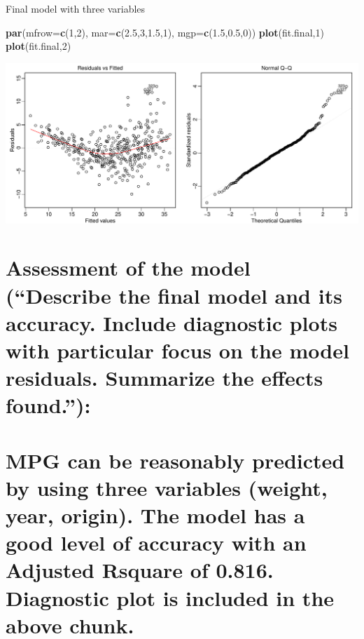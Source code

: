 \documentclass[]{article}
\newenvironment{Shaded}{\begin{snugshade}}{\end{snugshade}}
\newcommand{\KeywordTok}[1]{\textcolor[rgb]{0.13,0.29,0.53}{\textbf{#1}}}
\newcommand{\DataTypeTok}[1]{\textcolor[rgb]{0.13,0.29,0.53}{#1}}
\newcommand{\DecValTok}[1]{\textcolor[rgb]{0.00,0.00,0.81}{#1}}
\newcommand{\FloatTok}[1]{\textcolor[rgb]{0.00,0.00,0.81}{#1}}
\newcommand{\NormalTok}[1]{#1}
\begin{document}
Final model with three variables

\begin{Shaded}
\begin{Highlighting}[]
\KeywordTok{par}\NormalTok{(}\DataTypeTok{mfrow=}\KeywordTok{c}\NormalTok{(}\DecValTok{1}\NormalTok{,}\DecValTok{2}\NormalTok{), }\DataTypeTok{mar=}\KeywordTok{c}\NormalTok{(}\FloatTok{2.5}\NormalTok{,}\DecValTok{3}\NormalTok{,}\FloatTok{1.5}\NormalTok{,}\DecValTok{1}\NormalTok{), }\DataTypeTok{mgp=}\KeywordTok{c}\NormalTok{(}\FloatTok{1.5}\NormalTok{,}\FloatTok{0.5}\NormalTok{,}\DecValTok{0}\NormalTok{))}
\KeywordTok{plot}\NormalTok{(fit.final,}\DecValTok{1}\NormalTok{)}
\KeywordTok{plot}\NormalTok{(fit.final,}\DecValTok{2}\NormalTok{)}
\end{Highlighting}
\end{Shaded}

\includegraphics{hw2_fall18_files/figure-latex/unnamed-chunk-17-1.pdf}

\section{\texorpdfstring{Assessment of the model (``Describe the final
model and its accuracy. Include diagnostic plots with particular focus
on the model residuals. Summarize the effects
found.''):}{Assessment of the model (Describe the final model and its accuracy. Include diagnostic plots with particular focus on the model residuals. Summarize the effects found.):}}\label{assessment-of-the-model-describe-the-final-model-and-its-accuracy.-include-diagnostic-plots-with-particular-focus-on-the-model-residuals.-summarize-the-effects-found.}

\section{MPG can be reasonably predicted by using three variables
(weight, year, origin). The model has a good level of accuracy with an
Adjusted Rsquare of 0.816. Diagnostic plot is included in the above
chunk.}\label{mpg-can-be-reasonably-predicted-by-using-three-variables-weight-year-origin.-the-model-has-a-good-level-of-accuracy-with-an-adjusted-rsquare-of-0.816.-diagnostic-plot-is-included-in-the-above-chunk.}
\end{document}
